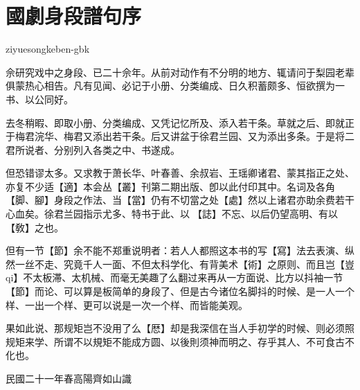 \chapter*[序]{國劇身段譜句序}{ziyuesongkeben-gbk}
 
佘研究戏中之身段、已二十佘年。从前对动作有不分明的地方、辄请问于梨园老辈俱蒙热心相告。凡有见闻、必记于小册、分类编成、日久积蓄颇多、恒欲撰为一书、以公同好。

去冬稍暇、即取小册、分类编成、又凭记忆所及、添入若干条。草就之后、即就正于梅君浣华、梅君又添出若干条。后又讲盆于徐君兰园、又为添出多条。于是将二君所说者、分别列入各类之中、书遂成。

但恐错谬太多。又求教于萧长华、叶春善、余叔岩、王瑶卿诸君、蒙其指正之处、亦复不少适【適】本会丛【叢】刊第二期出版、卽以此付印其中。名词及各角【脚、腳】身段之作法、当【當】仍有不切當之处【處】然以上诸君亦助余费若干心血矣。徐君兰园指示尤多、特书于此、以𰵧【誌】不忘、以后仍望高明、有以【敎】之也。

但有一节【節】余不能不郑重说明者：若人人都照这本书的写【寫】法去表演、纵然一丝不走、究竟千人一面、不但太科学化、有背美术【術】之原则、而且岂【豈qi】不太板滞、太机械、而毫无美趣了么翻过来再从一方面说、比方以抖袖一节【節】而论、可以算是板简单的身段了、但是古今诸位名脚抖的时候、是一人一个样、一出一个样、更可以说是一次一个样、而皆能美观。

果如此说、那规矩岂不没用了么【厯】却是我深信在当人手初学的时候、则必须照规矩来学、所谓不以規矩不能成方圆、以後則须神而明之、存乎其人、不可食古不化也。

\hfill
民國二十一年春高陽齊如山識